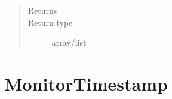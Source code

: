 \documentclass[letterpaper,10pt,english]{sphinxmanual}
\begin{document}
\begin{fulllineitems}
\begin{fulllineitems}
\begin{quote}
\begin{description}
\begin{itemize}
\end{itemize}

\item[{Returns}] \leavevmode
{}

\item[{Return type}] \leavevmode
array/list

\end{description}\end{quote}

\end{fulllineitems}


\end{fulllineitems}



\section{MonitorTimestamp}
\label{\detokenize{Reference:monitortimestamp}}
\end{document}
